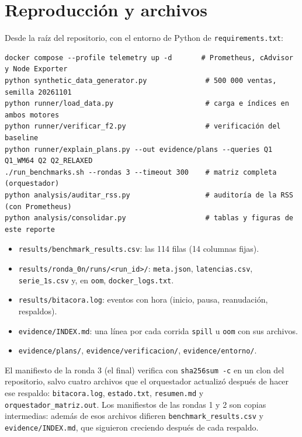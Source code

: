 \documentclass[11pt,a4paper]{article}
\newcommand{\cod}[1]{\texttt{#1}}
\begin{document}
\appendix
\section{Reproducción y archivos}
Desde la raíz del repositorio, con el entorno de Python de \cod{requirements.txt}:
\begin{lstlisting}
docker compose --profile telemetry up -d       # Prometheus, cAdvisor y Node Exporter
python synthetic_data_generator.py              # 500 000 ventas, semilla 20261101
python runner/load_data.py                      # carga e índices en ambos motores
python runner/verificar_f2.py                   # verificación del baseline
python runner/explain_plans.py --out evidence/plans --queries Q1 Q1_WM64 Q2 Q2_RELAXED
./run_benchmarks.sh --rondas 3 --timeout 300    # matriz completa (orquestador)
python analysis/auditar_rss.py                  # auditoría de la RSS (con Prometheus)
python analysis/consolidar.py                   # tablas y figuras de este reporte
\end{lstlisting}

\begin{itemize}
\item \cod{results/benchmark\_results.csv}: las 114 filas (14 columnas fijas).
\item \cod{results/ronda\_0n/runs/<run\_id>/}: \cod{meta.json}, \cod{latencias.csv},
  \cod{serie\_1s.csv} y, en \cod{oom}, \cod{docker\_logs.txt}.
\item \cod{results/bitacora.log}: eventos con hora (inicio, pausa, reanudación, respaldos).
\item \cod{evidence/INDEX.md}: una línea por cada corrida \cod{spill} u \cod{oom} con sus
  archivos.
\item \cod{evidence/plans/}, \cod{evidence/verificacion/}, \cod{evidence/entorno/}.
\end{itemize}

El manifiesto de la ronda 3 (el final) verifica con \cod{sha256sum -c} en un clon del
repositorio, salvo cuatro archivos que el orquestador actualizó después de hacer ese
respaldo: \cod{bitacora.log}, \cod{estado.txt}, \cod{resumen.md} y
\cod{orquestador\_matriz.out}. Los manifiestos de las rondas 1 y 2 son copias intermedias:
además de esos archivos difieren \cod{benchmark\_results.csv} y \cod{evidence/INDEX.md},
que siguieron creciendo después de cada respaldo.
\end{document}
